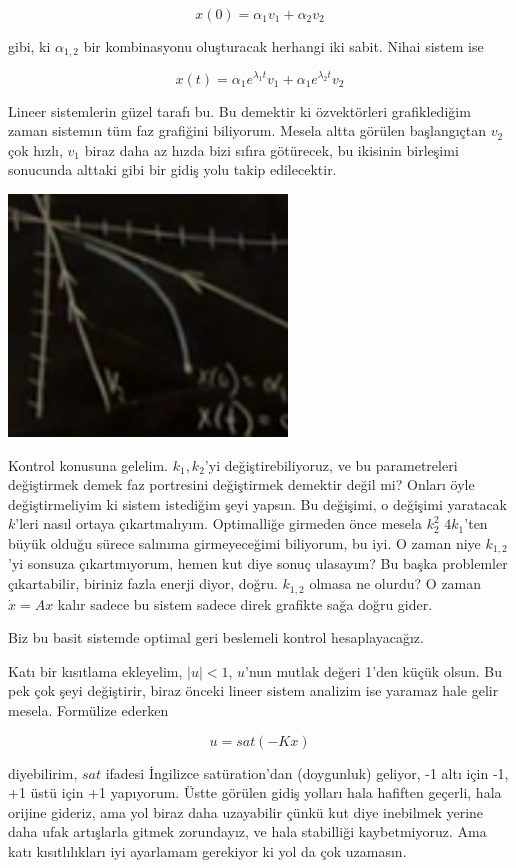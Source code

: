 \documentclass[12pt,fleqn]{article}\usepackage{../../common}
\begin{document}
$$
x(0) = \alpha_1 v_1 + \alpha_2 v_2
$$

gibi, ki $\alpha_{1,2}$ bir kombinasyonu oluşturacak herhangi iki
sabit. Nihai sistem ise 

$$ 
x(t) = \alpha_1 e^{\lambda_1 t}v_1  + \alpha_1 e^{\lambda_2 t} v_2
$$

Lineer sistemlerin güzel tarafı bu. Bu demektir ki özvektörleri
grafiklediğim zaman sistemın tüm faz grafiğini biliyorum. Mesela altta
görülen başlangıçtan $v_2$ çok hızlı, $v_1$ biraz daha az hızda bizi sıfıra
götürecek, bu ikisinin birleşimi sonucunda alttaki gibi bir gidiş yolu
takip edilecektir.

\includegraphics[width=20em]{phy_control_03.png}

Kontrol konusuna gelelim. $k_1,k_2$'yi değiştirebiliyoruz, ve bu
parametreleri değiştirmek demek faz portresini değiştirmek demektir değil
mi? Onları öyle değiştirmeliyim ki sistem istediğim şeyi yapsın. Bu
değişimi, o değişimi yaratacak $k$'leri nasıl ortaya
çıkartmalıyım. Optimalliğe girmeden önce mesela $k_2^2$ $4k_1$'ten büyük
olduğu sürece salınıma girmeyeceğimi biliyorum, bu iyi. O zaman niye
$k_{1,2}$'yi sonsuza çıkartmıyorum, hemen kut diye sonuç ulasayım? Bu başka
problemler çıkartabilir, biriniz fazla enerji diyor, doğru. $k_{1,2}$
olmasa ne olurdu? O zaman $\dot{x} = Ax$ kalır sadece bu sistem sadece
direk grafikte sağa doğru gider. 

Biz bu basit sistemde optimal geri beslemeli kontrol hesaplayacağız. 

Katı bir kısıtlama ekleyelim, $|u| < 1$, $u$'nun mutlak değeri 1'den küçük
olsun. Bu pek çok şeyi değiştirir, biraz önceki lineer sistem analizim ise
yaramaz hale gelir mesela. Formülize ederken 

$$ 
u = sat(-Kx)
$$

diyebilirim, $sat$ ifadesi İngilizce satüration'dan (doygunluk) geliyor, -1
altı için -1, +1 üstü için +1 yapıyorum. Üstte görülen gidiş yolları hala
hafiften geçerli, hala orijine gideriz, ama yol biraz daha uzayabilir çünkü
kut diye inebilmek yerine daha ufak artışlarla gitmek zorundayız, ve hala
stabilliği kaybetmiyoruz. Ama katı kısıtlılıkları iyi ayarlamam gerekiyor
ki yol da çok uzamasın. 
\end{document}
